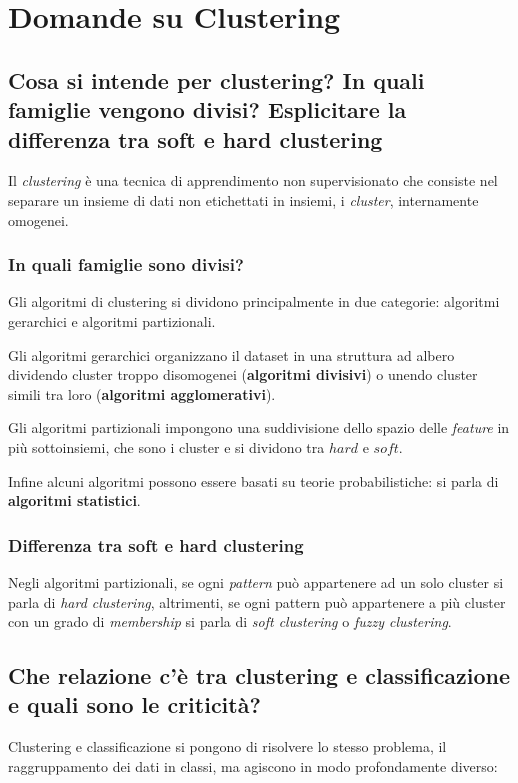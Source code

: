 \documentclass[\main/main.tex]{subfiles}
\begin{document}
\section{Domande su Clustering}

\subsection{Cosa si intende per clustering? In quali famiglie vengono divisi? Esplicitare la differenza tra soft e hard clustering}
Il \textit{clustering} è una tecnica di apprendimento non supervisionato che consiste nel separare un insieme di dati non etichettati in insiemi, i \textit{cluster}, internamente omogenei.

\subsubsection*{In quali famiglie sono divisi?}
Gli algoritmi di clustering si dividono principalmente in due categorie: algoritmi gerarchici e algoritmi partizionali.

Gli algoritmi gerarchici organizzano il dataset in una struttura ad albero dividendo cluster troppo disomogenei (\textbf{algoritmi divisivi}) o unendo cluster simili tra loro (\textbf{algoritmi agglomerativi}).

Gli algoritmi partizionali impongono una suddivisione dello spazio delle \textit{feature} in più sottoinsiemi, che sono i cluster e si dividono tra $hard$ e $soft$.

Infine alcuni algoritmi possono essere basati su teorie probabilistiche: si parla di \textbf{algoritmi statistici}.

\subsubsection{Differenza tra soft e hard clustering}
Negli algoritmi partizionali, se ogni \textit{pattern} può appartenere ad un solo cluster si parla di \textit{hard clustering}, altrimenti, se ogni pattern può appartenere a più cluster con un grado di \textit{membership} si parla di \textit{soft clustering} o \textit{fuzzy clustering}.

\subsection{Che relazione c'è tra clustering e classificazione e quali sono le criticità?}
Clustering e classificazione si pongono di risolvere lo stesso problema, il raggruppamento dei dati in classi, ma agiscono in modo profondamente diverso:
\end{document}
